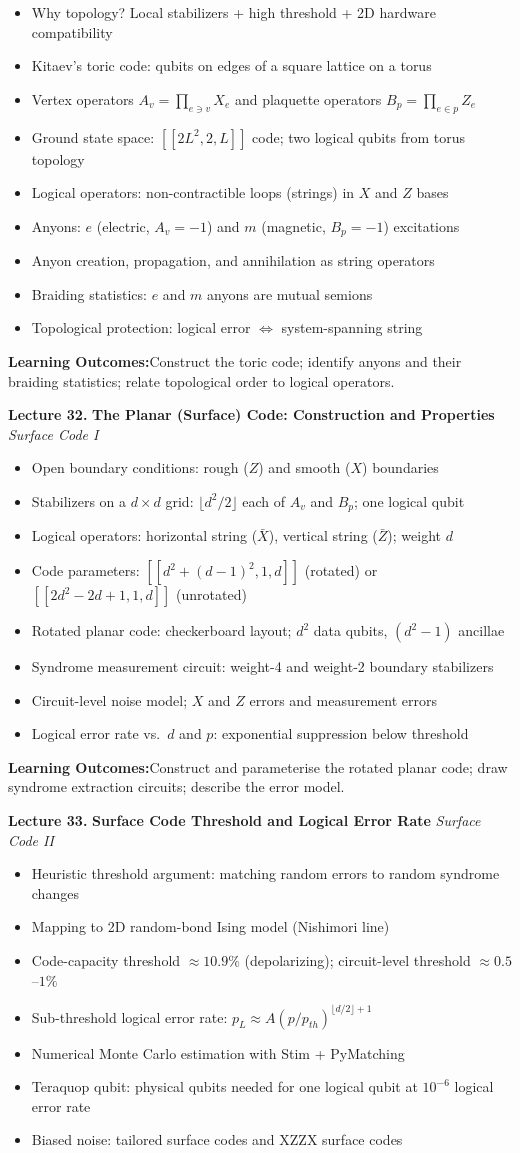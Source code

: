 \documentclass[12pt,oneside]{article}
\newcommand{\lecturetitle}[3]{%
  \vspace{10pt}
  \begin{tcolorbox}[
    enhanced,breakable,
    colback=highlight,colframe=accent,
    arc=2pt,left=10pt,right=8pt,top=7pt,bottom=7pt,boxrule=0.7pt
  ]
    \textbf{\color{accent}Lecture #1.\enspace}%
    {\color{primary}\bfseries #2}%
    \hfill{\small\color{warmgold}\textit{#3}}
  \end{tcolorbox}
  \vspace{-2pt}
}
\newcommand{\topics}[1]{%
  \begin{itemize}[leftmargin=1.5em,itemsep=1.5pt,topsep=3pt,parsep=0pt]
    #1
  \end{itemize}\vspace{2pt}
}
\newcommand{\T}[1]{\item #1}
\newcommand{\keybox}[1]{%
  \begin{tcolorbox}[
    enhanced,colback=lightgray,colframe=rulegray,
    arc=2pt,left=8pt,right=8pt,top=5pt,bottom=5pt,boxrule=0.4pt,
    fontupper=\small
  ]
    \textbf{\color{primary}Learning Outcomes:\enspace}#1
  \end{tcolorbox}\vspace{4pt}
}
\begin{document}
\topics{
  \T{Why topology? Local stabilizers + high threshold + 2D hardware compatibility}
  \T{Kitaev's toric code: qubits on edges of a square lattice on a torus}
  \T{Vertex operators $A_v = \prod_{e\ni v}X_e$ and plaquette operators $B_p = \prod_{e\in p}Z_e$}
  \T{Ground state space: $[[2L^2, 2, L]]$ code; two logical qubits from torus topology}
  \T{Logical operators: non-contractible loops (strings) in $X$ and $Z$ bases}
  \T{Anyons: $e$ (electric, $A_v=-1$) and $m$ (magnetic, $B_p=-1$) excitations}
  \T{Anyon creation, propagation, and annihilation as string operators}
  \T{Braiding statistics: $e$ and $m$ anyons are mutual semions}
  \T{Topological protection: logical error $\Leftrightarrow$ system-spanning string}
}

\keybox{Construct the toric code; identify anyons and their braiding statistics; relate topological order to logical operators.}

\lecturetitle{32}{The Planar (Surface) Code: Construction and Properties}{Surface Code I}

\topics{
  \T{Open boundary conditions: rough ($Z$) and smooth ($X$) boundaries}
  \T{Stabilizers on a $d\times d$ grid: $\lfloor d^2/2\rfloor$ each of $A_v$ and $B_p$; one logical qubit}
  \T{Logical operators: horizontal string ($\bar{X}$), vertical string ($\bar{Z}$); weight $d$}
  \T{Code parameters: $[[d^2+(d-1)^2, 1, d]]$ (rotated) or $[[2d^2-2d+1, 1, d]]$ (unrotated)}
  \T{Rotated planar code: checkerboard layout; $d^2$ data qubits, $(d^2-1)$ ancillae}
  \T{Syndrome measurement circuit: weight-4 and weight-2 boundary stabilizers}
  \T{Circuit-level noise model; $X$ and $Z$ errors and measurement errors}
  \T{Logical error rate vs.\ $d$ and $p$: exponential suppression below threshold}
}

\keybox{Construct and parameterise the rotated planar code; draw syndrome extraction circuits; describe the error model.}

\lecturetitle{33}{Surface Code Threshold and Logical Error Rate}{Surface Code II}

\topics{
  \T{Heuristic threshold argument: matching random errors to random syndrome changes}
  \T{Mapping to 2D random-bond Ising model (Nishimori line)}
  \T{Code-capacity threshold $\approx 10.9\%$ (depolarizing); circuit-level threshold $\approx 0.5$--$1\%$}
  \T{Sub-threshold logical error rate: $p_L \approx A(p/p_{th})^{\lfloor d/2 \rfloor + 1}$}
  \T{Numerical Monte Carlo estimation with Stim + PyMatching}
  \T{Teraquop qubit: physical qubits needed for one logical qubit at $10^{-6}$ logical error rate}
  \T{Biased noise: tailored surface codes and XZZX surface codes}
}
\end{document}

